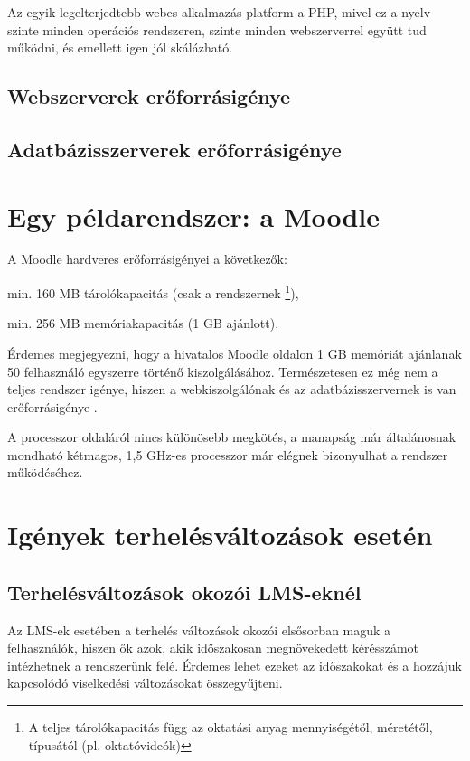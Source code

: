 Az egyik legelterjedtebb webes alkalmazás platform a PHP, mivel ez a nyelv szinte minden operációs rendszeren, szinte minden webszerverrel együtt tud működni, és emellett igen jól skálázható.

\subsection{Webszerverek erőforrásigénye}


\subsection{Adatbázisszerverek erőforrásigénye}


\section{Egy példarendszer: a Moodle}
A Moodle hardveres erőforrásigényei a következők:
\begin{sajat_itemize}
\item min. 160 MB tárolókapacitás (csak a rendszernek \footnote{A teljes tárolókapacitás függ az oktatási anyag mennyiségétől, méretétől, típusától (pl. oktatóvideók)}),
\item min. 256 MB memóriakapacitás (1 GB ajánlott).
\end{sajat_itemize}
Érdemes megjegyezni, hogy a hivatalos Moodle oldalon 1 GB memóriát ajánlanak 50 felhasználó egyszerre történő kiszolgálásához.
Természetesen ez még nem a teljes rendszer igénye, hiszen a webkiszolgálónak és az adatbázisszervernek is van erőforrásigénye \cite{moodleinst}.

A processzor oldaláról nincs különösebb megkötés, a manapság már általánosnak mondható kétmagos, 1,5 GHz-es processzor már elégnek bizonyulhat a rendszer működéséhez.

\section{Igények terhelésváltozások esetén}

\subsection{Terhelésváltozások okozói LMS-eknél}

Az LMS-ek esetében a terhelés változások okozói elsősorban maguk a felhasználók, hiszen ők azok, akik időszakosan megnövekedett kérésszámot intézhetnek a rendszerünk felé. Érdemes lehet ezeket az időszakokat és a hozzájuk kapcsolódó viselkedési változásokat összegyűjteni.

